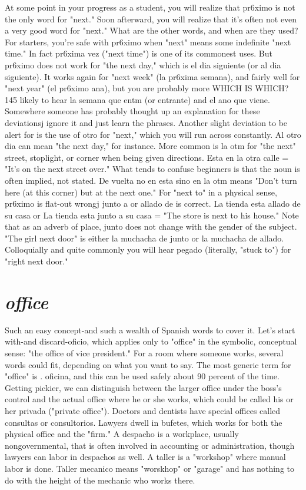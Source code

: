 \documentclass[14pt,a4paper,oneside]{memoir}
\begin{document}
At some point in your progress as a student, you will realize
that pr6ximo is not the only word for "next." Soon afterward, you will
realize that it's often not even a very good word for "next." What are
the other words, and when are they used? For starters, you're safe with
pr6ximo when "next" means some indefinite "next time." In fact
pr6xima vez ("next time") is one of its commonest uses. But pr6ximo
does not work for "the next day," which is el dia siguiente (or al dia
siguiente). It works again for "next week" (la pr6xima semana), and
fairly well for "next year" (el pr6ximo ana), but you are probably more
WHICH IS WHICH? 145
likely to hear la semana que entm (or entrante) and el ano que viene.
Somewhere someone has probably thought up an explanation for these
deviationsj ignore it and just learn the phrases.
Another slight deviation to be alert for is the use of otro for
"next," which you will run across constantly. Al otro dia can mean
"the next day," for instance. More common is la otm for "the next"
street, stoplight, or corner when being given directions. Esta en la otra
calle = "It's on the next street over." What tends to confuse beginners
is that the noun is often implied, not stated. De vuelta no en esta sino
en la otm means "Don't turn here (at this corner) but at the next one."
For "next to" in a physical sense, pr6ximo is flat-out wrongj
junto a or allado de is correct. La tienda esta allado de su casa or La
tienda esta junto a su casa = "The store is next to his house." Note
that as an adverb of place, junto does not change with the gender of
the subject. "The girl next door" is either la muchacha de junto or la
muchacha de allado. Colloquially and quite commonly you will hear
pegado (literally, "stuck to") for "right next door."

\section{\emph{office}}

Such an easy concept-and such a wealth of Spanish words to
cover it. Let's start with-and discard-oficio, which applies only to
"office" in the symbolic, conceptual sense: "the office of vice president." For a room where someone works, several words could fit, depending on what you want to say. The most generic term for "office" is
. oficina, and this can be used safely about 90 percent of the time. Getting pickier, we can distinguish between the larger office under the
boss's control and the actual office where he or she works, which could
be called his or her privada ("private office"). Doctors and dentists
have special offices called consultas or consultorios. Lawyers dwell in
bufetes, which works for both the physical office and the "firm." A
despacho is a workplace, usually nongovernmental, that is often involved in accounting or administration, though lawyers can labor in
despachos as well. A taller is a "workshop" where manual labor is
done. Taller mecanico means "worskhop" or "garage" and has nothing
to do with the height of the mechanic who works there.
\end{document}

